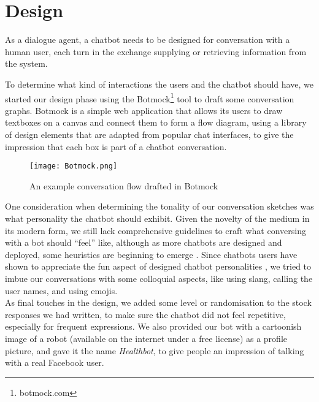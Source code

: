 \section{Design}
As a dialogue agent, a chatbot needs to be designed for conversation with a human user, each turn in the exchange supplying or retrieving information from the system.

To determine what kind of interactions the users and the chatbot should have, we started our design phase using the Botmock\footnote{botmock.com} tool to draft some conversation graphs. Botmock is a simple web application that allows its users to draw textboxes on a canvas and connect them to form a flow diagram, using a library of design elements that are adapted from popular chat interfaces, to give the impression that each box is part of a chatbot conversation.

\begin{figure}[h!]
  \texttt{[image: Botmock.png]}
  \caption{An example conversation flow drafted in Botmock}
\end{figure}
One consideration when determining the tonality of our conversation sketches was what personality the chatbot should exhibit. Given the novelty of the medium in its modern form, we still lack comprehensive guidelines to craft what conversing with a bot should ``feel'' like, although as more chatbots are designed and deployed, some heuristics are beginning to emerge \cite{jessie}. Since chatbots users have shown to appreciate the fun aspect of designed chatbot personalities \cite{10.1007/978-3-319-67744-6_28}, we tried to imbue our conversations with some colloquial aspects, like using slang, calling the user names, and using emojis. \\
As final touches in the design, we added some level or randomisation to the stock responses we had written, to make sure the chatbot did not feel repetitive, especially for frequent expressions. We also provided our bot with a cartoonish image of a robot (available on the internet under a free license) as a profile picture, and gave it the name \textit{Healthbot}, to give people an impression of talking with a real Facebook user.
